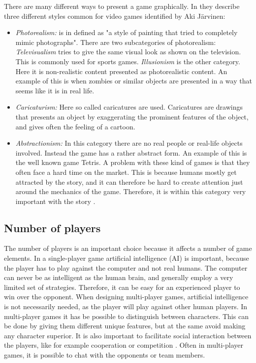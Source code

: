 There are many different ways to present a game graphically. In \cite{understandingvg} they describe three different styles common for video games identified by Aki Järvinen: 

\begin{itemize}
\item \emph{Photorealism:} is in \cite{understandingvg} defined as "a style of painting that tried to completely mimic photographs". There are two subcategories of photorealism: \emph{Televisualism} tries to give the same visual look as shown on the television. This is commonly used for sports games. \emph{Illusionism} is the other category. Here it is non-realistic content presented as photorealistic content. An example of this is when zombies or similar objects are presented in a way that seems like it is in real life.  
\item \emph{Caricaturism:} Here so called caricatures are used. Caricatures are drawings that presents an object by exaggerating the prominent features of the object, and gives often the feeling of a cartoon. 
\item \emph{Abstractionism:} In this category there are no real people or real-life objects involved. Instead  the game has a rather abstract form. An example of this is the well known game Tetris. A problem with these kind of games is that they often face a hard time on the market. This is because humans mostly get attracted by the story, and it can therefore be hard to create attention just around the mechanics of the game. Therefore, it is within this category very important with the story \cite{understandingvg}. 
\end{itemize}

\subsection{Number of players}
\label{subsec:numbers}
The number of players is an important choice because it affects a number of game elements. In a single-player game artificial intelligence (AI) is important, because the player has to play against the computer and not real humans. The computer can never be as intelligent as the human brain, and generally employ a very limited set of strategies. Therefore, it can be easy for an experienced player to win over the opponent. When designing multi-player games, artificial intelligence is not necessarily needed, as the player will play against other human players. In multi-player games it has be possible to distinguish between characters. This can be done by giving them different unique features, but at the same avoid making any character superior. It is also important to facilitate social interaction between the players, like for example cooperation or competition \cite{understandingvg}. Often in multi-player games, it is possible to chat with the opponents or team members. 

